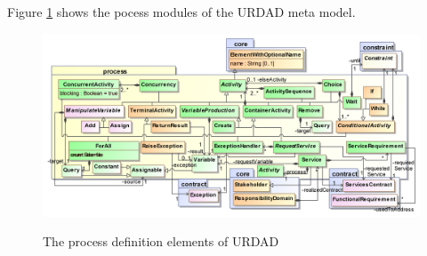 Figure \ref{fig:processModule} shows the pocess modules of the URDAD meta model.
\begin{figure}[thbp]
  \centering
  \includegraphics[width=\pagewidth]{process}\\   
  \caption{The process definition elements of URDAD}
  \label{fig:processModule}
\end{figure}
 
